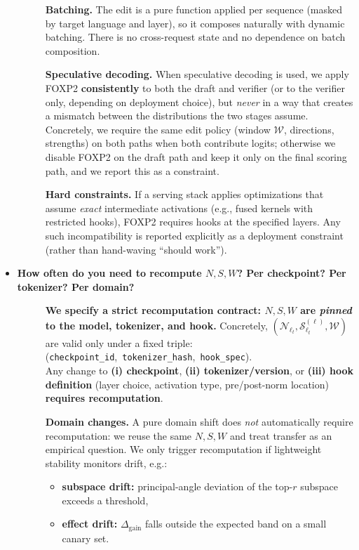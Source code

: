 \begin{itemize}[leftmargin=1.5em]
\begin{description}
\vspace{4pt}
\textbf{Batching.} The edit is a pure function applied per sequence (masked by target language and layer), so it composes naturally with dynamic batching. There is no cross-request state and no dependence on batch composition.

\vspace{4pt}
\textbf{Speculative decoding.} When speculative decoding is used, we apply FOXP2 \textbf{consistently} to both the draft and verifier (or to the verifier only, depending on deployment choice), but \emph{never} in a way that creates a mismatch between the distributions the two stages assume. Concretely, we require the same edit policy (window $\mathcal{W}$, directions, strengths) on both paths when both contribute logits; otherwise we disable FOXP2 on the draft path and keep it only on the final scoring path, and we report this as a constraint.

\vspace{4pt}
\textbf{Hard constraints.} If a serving stack applies optimizations that assume \emph{exact} intermediate activations (e.g., fused kernels with restricted hooks), FOXP2 requires hooks at the specified layers. Any such incompatibility is reported explicitly as a deployment constraint (rather than hand-waving “should work”).
\end{description}


\item[\ding{93}] \textbf{How often do you need to recompute $N,S,W$? Per checkpoint? Per tokenizer? Per domain?}
\begin{description}
\item[] \textbf{We specify a strict recomputation contract: $N,S,W$ are \emph{pinned} to the model, tokenizer, and hook.}
Concretely, $(\mathcal{N}_{\ell_t},\mathcal{S}^{(\ell)}_{\ell_t},\mathcal{W})$ are valid only under a fixed triple: (\texttt{checkpoint\_id},\ \texttt{tokenizer\_hash},\ \texttt{hook\_spec}). \\
Any change to \textbf{(i) checkpoint}, \textbf{(ii) tokenizer/version}, or \textbf{(iii) hook definition} (layer choice, activation type, pre/post-norm location) \textbf{requires recomputation}.

\vspace{4pt}
\textbf{Domain changes.} A pure domain shift does \emph{not} automatically require recomputation: we reuse the same $N,S,W$ and treat transfer as an empirical question. We only trigger recomputation if lightweight stability monitors drift, e.g.:
\begin{itemize}[leftmargin=*,itemsep=2pt]
\item \textbf{subspace drift:} principal-angle deviation of the top-$r$ subspace exceeds a threshold,
\item \textbf{effect drift:} $\Delta_{\mathrm{gain}}$ falls outside the expected band on a small canary set.
\end{itemize}


\end{description}
\end{itemize}
